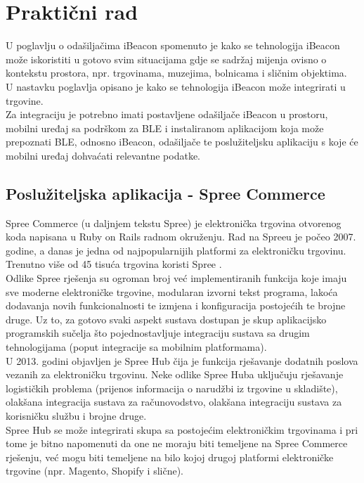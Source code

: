 \chapter{Praktični rad}

U poglavlju o odašiljačima iBeacon spomenuto je kako se tehnologija iBeacon može iskoristiti u gotovo svim situacijama gdje se sadržaj mijenja ovisno o kontekstu prostora, npr. trgovinama, muzejima, bolnicama i sličnim objektima. 
\\
U nastavku poglavlja opisano je kako se tehnologija iBeacon može integrirati u trgovine. 
\\

Za integraciju je potrebno imati postavljene odašiljače iBeacon u prostoru, mobilni uređaj sa podrškom za BLE i instaliranom aplikacijom koja može prepoznati BLE, odnosno iBeacon, odašiljače te poslužiteljsku aplikaciju s koje će mobilni uređaj dohvaćati relevantne podatke.  

\section{Poslužiteljska aplikacija - Spree Commerce}
\label{sec:server}

Spree Commerce (u daljnjem tekstu Spree) je elektronička trgovina  otvorenog koda napisana u Ruby on Rails radnom okruženju. 
Rad na Spreeu je počeo 2007. godine, a danas je jedna od najpopularnijih platformi za elektroničku trgovinu. 
Trenutno više od 45 tisuća trgovina koristi Spree \citep{spreeStorefront}.
\\
Odlike Spree rješenja su ogroman broj već implementiranih funkcija koje imaju sve moderne elektroničke trgovine, modularan izvorni tekst programa, lakoća dodavanja novih funkcionalnosti te izmjena i konfiguracija postojećih te brojne druge. 
Uz to, za gotovo svaki aspekt sustava dostupan je skup aplikacijsko programskih sučelja što pojednostavljuje integraciju sustava sa drugim tehnologijama (poput integracije sa mobilnim platformama).
\\
U 2013. godini objavljen je Spree Hub čija je funkcija rješavanje dodatnih poslova vezanih za elektroničku trgovinu. 
Neke odlike Spree Huba uključuju rješavanje logističkih problema (prijenos informacija o narudžbi iz trgovine u skladište), olakšana integracija sustava za računovodstvo, olakšana integraciju sustava za korisničku službu i brojne druge.
\\
Spree Hub se može integrirati skupa sa postojećim elektroničkim trgovinama i pri tome je bitno napomenuti da one ne moraju biti temeljene na Spree Commerce rješenju, već mogu biti temeljene na bilo kojoj drugoj platformi elektroničke trgovine (npr. Magento, Shopify i slične). 

